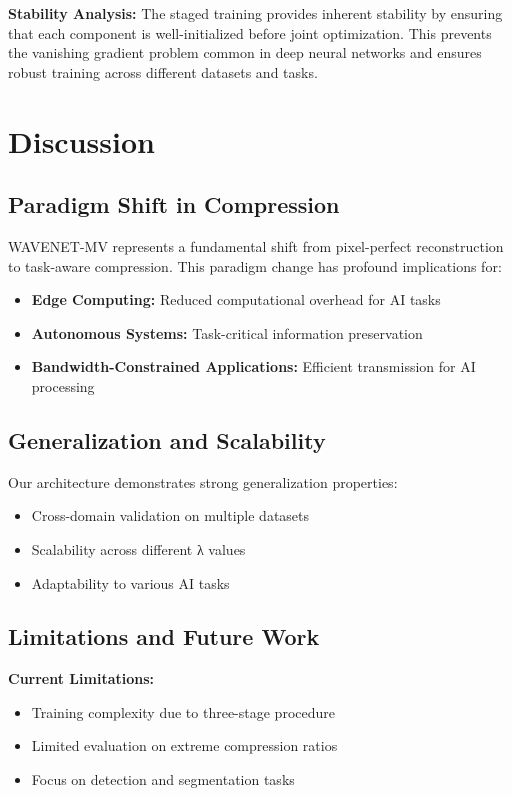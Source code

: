 \documentclass[conference]{IEEEtran}
\begin{document}
\textbf{Stability Analysis:} The staged training provides inherent stability by ensuring that each component is well-initialized before joint optimization. This prevents the vanishing gradient problem common in deep neural networks and ensures robust training across different datasets and tasks.

\section{Discussion}

\subsection{Paradigm Shift in Compression}

WAVENET-MV represents a fundamental shift from pixel-perfect reconstruction to task-aware compression. This paradigm change has profound implications for:

\begin{itemize}
\item \textbf{Edge Computing:} Reduced computational overhead for AI tasks
\item \textbf{Autonomous Systems:} Task-critical information preservation
\item \textbf{Bandwidth-Constrained Applications:} Efficient transmission for AI processing
\end{itemize}

\subsection{Generalization and Scalability}

Our architecture demonstrates strong generalization properties:
\begin{itemize}
\item Cross-domain validation on multiple datasets
\item Scalability across different λ values
\item Adaptability to various AI tasks
\end{itemize}

\subsection{Limitations and Future Work}

\textbf{Current Limitations:}
\begin{itemize}
\item Training complexity due to three-stage procedure
\item Limited evaluation on extreme compression ratios
\item Focus on detection and segmentation tasks
\end{itemize}
\end{document}
